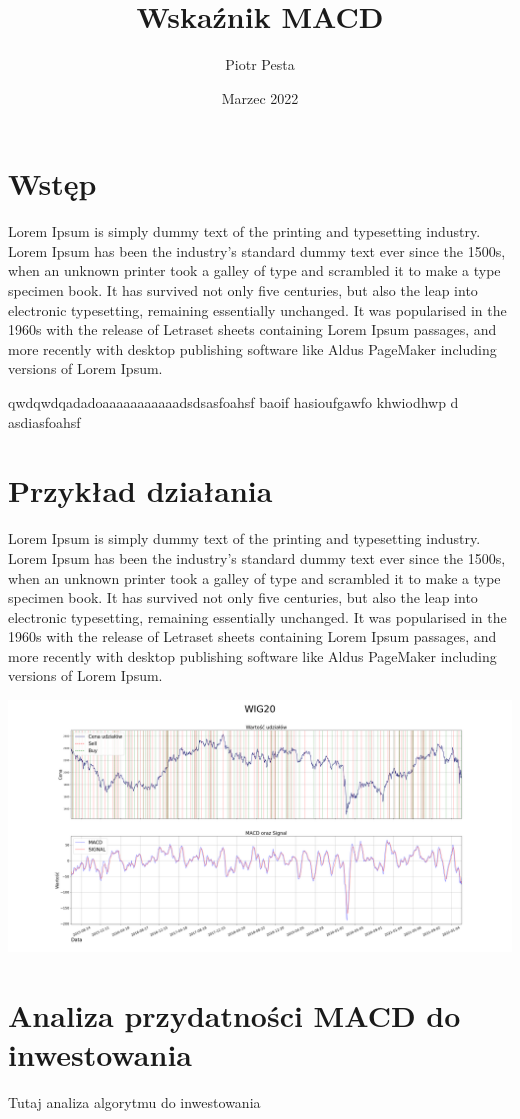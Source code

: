 \documentclass{article}
\title{Wskaźnik MACD}
\author{Piotr Pesta}
\date{Marzec 2022}
\begin{document}
\maketitle

\section{Wstęp}
    Lorem Ipsum is simply dummy text of the printing and typesetting industry. Lorem Ipsum has been the industry's standard dummy text ever since the 1500s, when an unknown printer took a galley of type and scrambled it to make a type specimen book. It has survived not only five centuries, but also the leap into electronic typesetting, remaining essentially unchanged. It was popularised in the 1960s with the release of Letraset sheets containing Lorem Ipsum passages, and more recently with desktop publishing software like Aldus PageMaker including versions of Lorem Ipsum.

    qwdqwdqadadoaaaaaaaaaaadsdsasfoahsf baoif hasioufgawfo khwiodhwp d
    asdiasfoahsf

\section{Przykład działania}
    Lorem Ipsum is simply dummy text of the printing and typesetting industry. Lorem Ipsum has been the industry's standard dummy text ever since the 1500s, when an unknown printer took a galley of type and scrambled it to make a type specimen book. It has survived not only five centuries, but also the leap into electronic typesetting, remaining essentially unchanged. It was popularised in the 1960s with the release of Letraset sheets containing Lorem Ipsum passages, and more recently with desktop publishing software like Aldus PageMaker including versions of Lorem Ipsum.


   \noindent\includegraphics[width=\textwidth]{WIG20}
    \centering

\section{Analiza przydatności MACD do inwestowania}

    Tutaj analiza algorytmu do inwestowania
\end{document}
